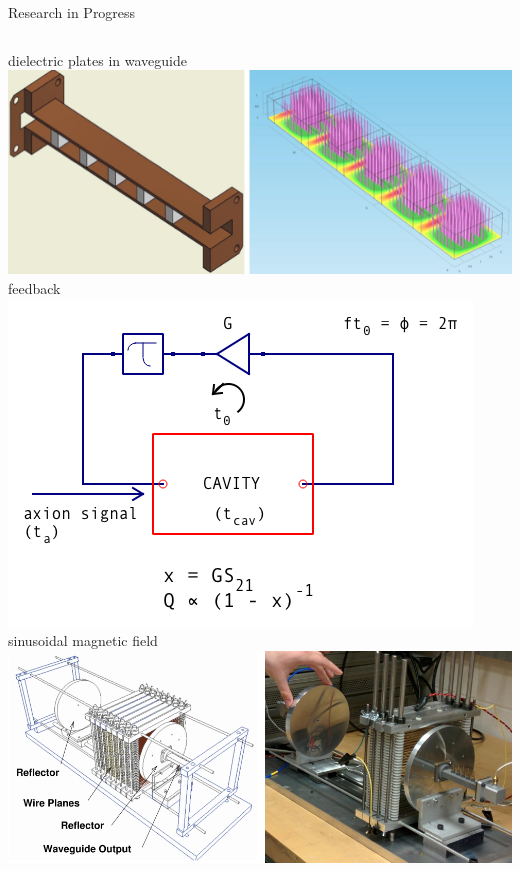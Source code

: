 \documentclass{beamer}
\begin{document}
\begin{frame}{Research in Progress}
\begin{columns}
{\tiny dielectric plates in waveguide}
\includegraphics[width=\textwidth]{dielectric_in_waveguide}
\vspace{10 mm}
{\tiny feedback}
\includegraphics[width=\textwidth]{delay}
{\tiny sinusoidal magnetic field}
\includegraphics[width=\textwidth]{orpheus_duo}


\end{columns}
\end{frame}
\end{document}
